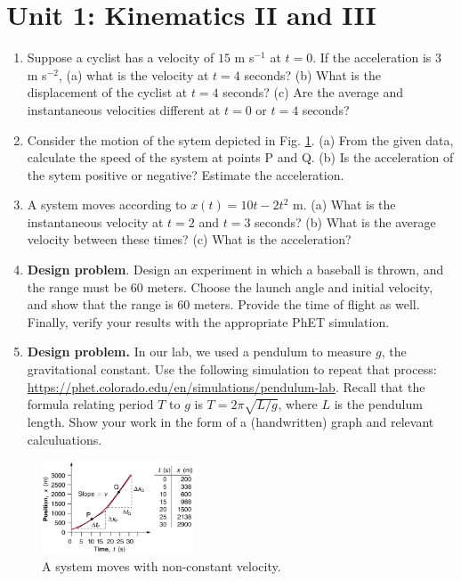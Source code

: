 \documentclass[10pt]{article}
\begin{document}
\section{Unit 1: Kinematics II and III}

\begin{enumerate}
\item Suppose a cyclist has a velocity of $15$ m s$^{-1}$ at $t=0$.  If the acceleration is 3 m s$^{-2}$, (a) what is the velocity at $t = 4$ seconds? (b) What is the displacement of the cyclist at $t = 4$ seconds? (c) Are the average and instantaneous velocities different at $t=0$ or $t=4$ seconds?  \\ \vspace{3cm}
\item Consider the motion of the sytem depicted in Fig. \ref{fig:1}.  (a) From the given data, calculate the speed of the system at points P and Q. (b) Is the acceleration of the sytem positive or negative?  Estimate the acceleration. \\ \vspace{3cm}
\item A system moves according to $x(t) = 10t - 2t^2$ m. (a) What is the instantaneous velocity at $t = 2$ and $t = 3$ seconds? (b) What is the average velocity between these times? (c) What is the acceleration? \\ \vspace{3cm}
\item \textbf{Design problem}.  Design an experiment in which a baseball is thrown, and the range must be 60 meters.  Choose the launch angle and initial velocity, and show that the range is 60 meters.  Provide the time of flight as well.  Finally, verify your results with the appropriate PhET simulation. \\ \vspace{3cm}
\item \textbf{Design problem.}  In our lab, we used a pendulum to measure $g$, the gravitational constant.  Use the following simulation to repeat that process: \url{https://phet.colorado.edu/en/simulations/pendulum-lab}. Recall that the formula relating period $T$ to $g$ is $T = 2\pi\sqrt{L/g}$, where $L$ is the pendulum length. Show your work in the form of a (handwritten) graph and relevant calculuations. \\ \vspace{4cm}
\end{enumerate}

\begin{figure}
\centering
\includegraphics[width=0.4\textwidth]{slope2.jpeg}
\caption{\label{fig:1} A system moves with non-constant velocity.}
\end{figure}
\end{document}
